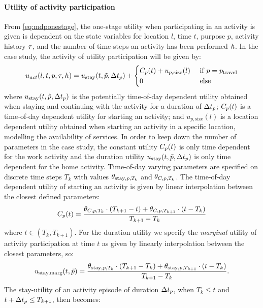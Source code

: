 \paragraph{Utility of activity participation}
From \eqref{eq:mdponestage}, the one-stage utility when participating in an activity is given is dependent on the state variables for location $l$, time $t$, purpose $p$, activity history $\tau$, and the number of time-steps an activity has been performed $h$. In the case study, the activity of utility participation will be given by:
\begin{equation}
	\avgu_{act}(l,t,p,\atime,\amem) = \ustay(t,\act{p},\dura{p}) + \begin{cases} 
	\ac_p(t) + u_{p,\text{size}}(l) &\cif p = p_{\text{travel}} \\
	0 & \celse
	\end{cases}
\end{equation}
where $u_\text{stay}(t,\tilde{p},\Delta t_p)$ is the potentially time-of-day dependent utility obtained when staying and continuing with the activity for a duration of $\Delta t_p$; $C_p(t)$ is a time-of-day dependent utility for starting an activity; and $u_{p,\text{size}}(l)$ is a location dependent utility obtained when starting an activity in a specific location, modelling the availability of services. In order to keep down the number of parameters in the case study, the constant utility $C_p(t)$ is only time dependent for the work activity and the duration utility $u_\text{stay}(t,\tilde{p},\Delta t_p)$ is only time dependent for the home activity. Time-of-day varying parameters are specified on discrete time steps $T_k$ with values $\theta_{\text{stay},p,T_k}$ and $\theta_{C,p,T_k}$. The time-of-day dependent utility of starting an activity is given by linear interpolation between the closest defined parameters:
\begin{equation*}
\ac_p(t) = \frac{\acp_{C,p,T_k}\cdot (T_{k+1}-t)+\acp_{C,p,T_{k+1}}\cdot (t-T_k)}{T_{k+1}-T_{k}}
\end{equation*}
where $t\in(T_k,T_{k+1})$. For the duration utility we specify the \emph{marginal} utility of activity participation at time $t$ as given by linearly interpolation between the closest parameters, so:
\begin{equation*}
u_\text{stay,marg}(t,\act{p}) = \frac{\theta_{\stay,p,T_k}\cdot(T_{k+1}-T_k)+\theta_{\stay,p,T_{k+1}}\cdot(t-T_k) }{T_{k+1}-T_{k}}.
\end{equation*}
The stay-utility of an activity episode of duration $\Delta t_p$, when $T_k\leq t$ and $t+\Delta t_p\leq T_{k+1}$, then becomes:

